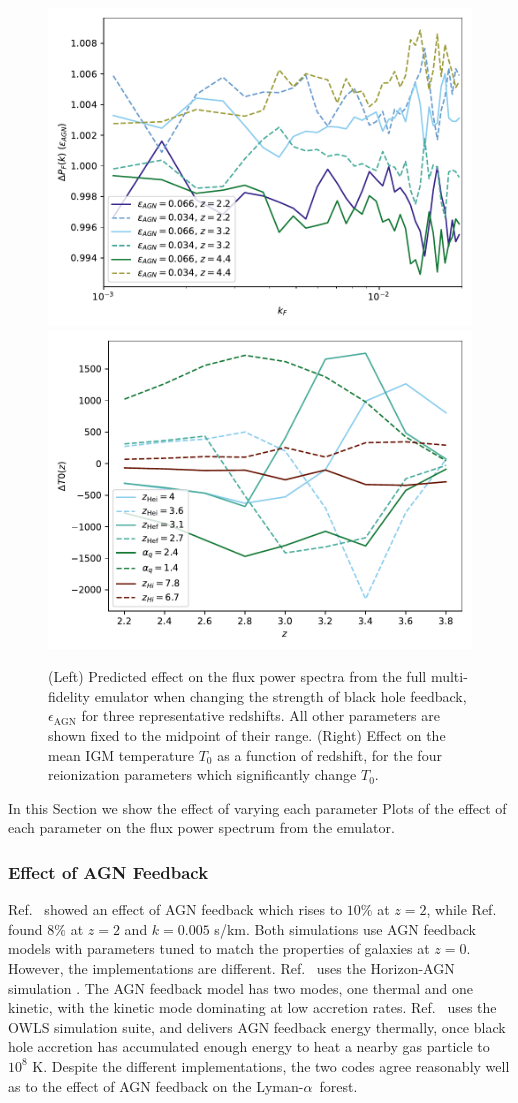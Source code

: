 \documentclass[a4paper,11pt]{article}
\newcommand{\Lya}{Lyman-$\alpha$}
\begin{document}
\begin{figure}
    \centering
    \includegraphics[width=0.48\columnwidth]{figures/single_param_bhfeedback.pdf}
    	\includegraphics[width=0.48\columnwidth]{figures/single_param_t0.pdf}
    \caption{(Left) Predicted effect on the flux power spectra from the full multi-fidelity emulator when changing the strength of black hole feedback, $\epsilon_\mathrm{AGN}$ for three representative redshifts. All other parameters are shown fixed to the midpoint of their range. (Right) Effect on the mean IGM temperature $T_0$ as a function of redshift, for the four reionization parameters which significantly change $T_0$.}
    \label{fig:meantempfluxpower}
\end{figure}

In this Section we show the effect of varying each parameter
Plots of the effect of each parameter on the flux power spectrum from the emulator.



\subsubsection{Effect of AGN Feedback}

Ref.~\cite{Viel:2013} showed an effect of AGN feedback which rises to $10\%$ at $z=2$, while Ref.~\cite{Chabanier:2020} found $8\%$ at $z=2$ and $k = 0.005$ s/km. Both simulations use AGN feedback models with parameters tuned to match the properties of galaxies at $z=0$. However, the implementations are different. Ref.~\cite{Chabanier:2020} uses the Horizon-AGN simulation \cite{Dubois:2016}. The AGN feedback model has two modes, one thermal and one kinetic, with the kinetic mode dominating at low accretion rates. Ref.~\cite{Viel:2013} uses the OWLS simulation suite, and delivers AGN feedback energy thermally, once black hole accretion has accumulated enough energy to heat a nearby gas particle to $10^8$ K. Despite the different implementations, the two codes agree reasonably well as to the effect of AGN feedback on the \Lya~forest.
\end{document}

